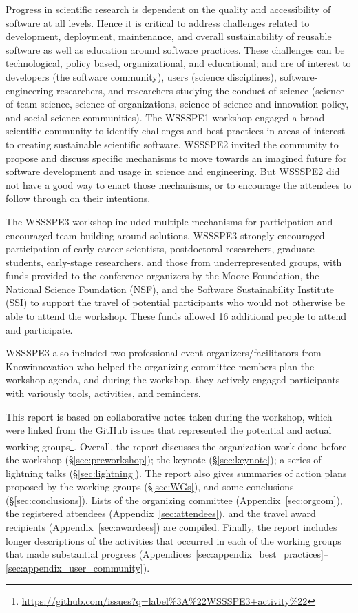 \documentclass[11pt, oneside]{amsart}
\begin{document}
Progress in scientific research is dependent on the quality and accessibility of
software at all levels. Hence it is critical to address challenges related to
development, deployment, maintenance, and overall sustainability of reusable
software as well as education around software practices. These challenges can be
technological, policy based, organizational, and educational; and are of
interest to developers (the software community), users (science disciplines),
software-engineering researchers, and researchers studying the conduct of
science (science of team science, science of organizations, science of science
and innovation policy, and social science communities). The WSSSPE1 workshop
engaged a broad scientific community to identify challenges and best practices
in areas of interest to creating sustainable scientific software. WSSSPE2
invited the community to propose and discuss specific mechanisms to move towards
an imagined future for software development and usage in science and
engineering. But WSSSPE2 did not have a good way to enact those mechanisms, or to
encourage the attendees to follow through on their intentions.

The WSSSPE3 workshop included multiple mechanisms for participation and
encouraged team building around solutions. WSSSPE3 strongly encouraged participation
of early-career scientists, postdoctoral researchers, graduate students,  
early-stage researchers, and those from underrepresented groups,
with funds provided to the conference organizers by the Moore Foundation, the
National Science Foundation (NSF), and the Software Sustainability Institute (SSI) to
support the travel of potential participants who would not otherwise be able to
attend the workshop. These
funds allowed 16 additional people to attend and participate.

WSSSPE3 also included two professional
event organizers/facilitators from Knowinnovation who helped the organizing committee members
plan the workshop agenda, and during the workshop, they actively engaged
participants with variously
tools, activities, and reminders. 

This report is based on collaborative notes taken during the workshop, which
were linked from the GitHub issues that represented the potential and actual
working
groups\footnote{\url{https://github.com/issues?q=label\%3A\%22WSSSPE3+activity\%22}}.
Overall, the report discusses the organization work done before the workshop
(\S\ref{sec:preworkshop}); the keynote (\S\ref{sec:keynote}); a series of
lightning talks (\S\ref{sec:lightning}). The report also gives summaries of
action plans proposed by the working groups (\S\ref{sec:WGs}), and some
conclusions (\S\ref{sec:conclusions}). Lists of the organizing committee
(Appendix~\ref{sec:orgcom}), the registered attendees
(Appendix~\ref{sec:attendees}), and the travel award recipients
(Appendix~\ref{sec:awardees}) are compiled. Finally, the report includes longer
descriptions of the activities that occurred in each of the working groups that
made substantial progress
(Appendices~\ref{sec:appendix_best_practices}--\ref{sec:appendix_user_community}).
\end{document}

